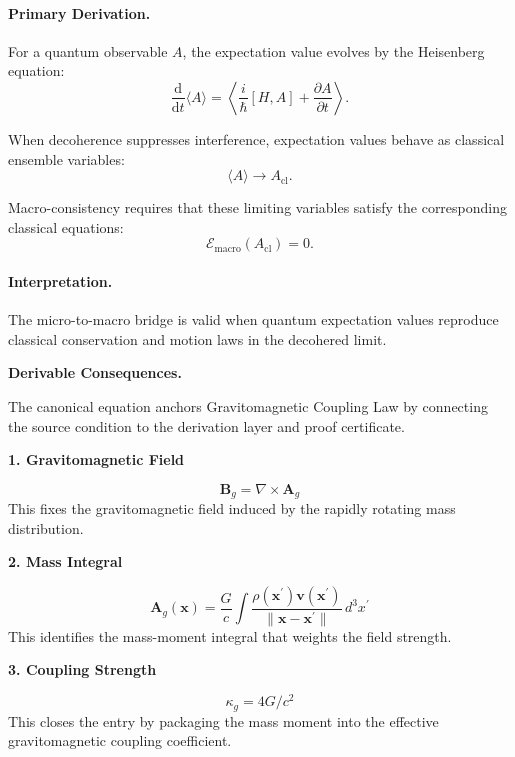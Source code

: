 \paragraph{Primary Derivation.}
For a quantum observable $A$, the expectation value evolves by the Heisenberg equation:
\begin{equation}
\frac{\mathrm{d}}{\mathrm{d}t}\langle A\rangle
=
\left\langle
\frac{i}{\hbar}[H,A]
+
\frac{\partial A}{\partial t}
\right\rangle .
\end{equation}

When decoherence suppresses interference, expectation values behave as classical ensemble variables:
\begin{equation}
\langle A\rangle
\rightarrow
A_{\mathrm{cl}}.
\end{equation}

Macro-consistency requires that these limiting variables satisfy the corresponding classical equations:
\begin{equation}
\boxed{
\mathcal{E}_{\mathrm{macro}}(A_{\mathrm{cl}})=0 .
}
\end{equation}

\paragraph{Interpretation.}
The micro-to-macro bridge is valid when quantum expectation values reproduce classical conservation and motion laws in the decohered limit.

\par\vspace{0.35em}
\noindent\textbf{Derivable Consequences.}\quad
\begingroup
\footnotesize
\raggedright
The canonical equation anchors Gravitomagnetic Coupling Law by connecting the source condition to the derivation layer and proof certificate.
\par\endgroup

\noindent\textbf{1. Gravitomagnetic Field}\par
\[
\mathbf{B}_{g}=\nabla\times\mathbf{A}_{g}
\]
\noindent This fixes the gravitomagnetic field induced by the rapidly rotating mass distribution.\par
\noindent\textbf{2. Mass Integral}\par
\[
\mathbf{A}_{g}(\mathbf{x})=\frac{G}{c}\int \frac{\rho(\mathbf{x}^{\prime})\mathbf{v}(\mathbf{x}^{\prime})}{\lVert\mathbf{x}-\mathbf{x}^{\prime}\rVert}\,d^{3}x^{\prime}
\]
\noindent This identifies the mass-moment integral that weights the field strength.\par
\noindent\textbf{3. Coupling Strength}\par
\[
\kappa_{g}=4G/c^{2}
\]
\noindent This closes the entry by packaging the mass moment into the effective gravitomagnetic coupling coefficient.\par

